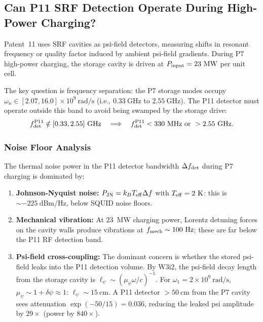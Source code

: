 \documentclass[aps,prd,twocolumn,superscriptaddress]{revtex4-2}
\begin{document}
\subsection{Can P11 SRF Detection Operate During High-Power Charging?}

Patent~11 uses SRF cavities as psi-field detectors, measuring shifts
in resonant frequency or quality factor induced by ambient psi-field
gradients.  During P7 high-power charging, the storage cavity is driven
at $P_{\rm input} = 23~\mathrm{MW}$ per unit cell.

The key question is frequency separation: the P7 storage modes occupy
$\omega_n \in [2.07, 16.0]\times 10^9~\mathrm{rad/s}$ (i.e.,
$0.33~\mathrm{GHz}$ to $2.55~\mathrm{GHz}$).  The P11 detector must
operate outside this band to avoid being swamped by the storage drive:
\begin{equation}
f_{\rm det}^{\rm P11} \notin [0.33, 2.55]~\mathrm{GHz}
\quad \Longrightarrow \quad f_{\rm det}^{\rm P11} < 330~\mathrm{MHz}
~\text{or}~ > 2.55~\mathrm{GHz}.
\end{equation}

\subsubsection{Noise Floor Analysis}

The thermal noise power in the P11 detector bandwidth $\Delta f_{\rm det}$
during P7 charging is dominated by:
\begin{enumerate}
\item \textbf{Johnson-Nyquist noise:} $P_{\rm JN} = k_B T_{\rm eff} \Delta f$
  with $T_{\rm eff} = 2~\mathrm{K}$: this is $\sim -225~\mathrm{dBm/Hz}$,
  below SQUID noise floors.
\item \textbf{Mechanical vibration:} At 23~MW charging power, Lorentz
  detuning forces on the cavity walls produce vibrations at
  $f_{\rm mech} \sim 100~\mathrm{Hz}$; these are far below the P11 RF
  detection band.
\item \textbf{Psi-field cross-coupling:} The dominant concern is whether
  the stored psi-field leaks into the P11 detection volume.  By W3i2,
  the psi-field decay length from the storage cavity is
  $\ell_\psi \sim (\mu_\psi \omega / c)^{-1}$.  For $\omega_1 = 2\times
  10^9~\mathrm{rad/s}$, $\mu_\psi \sim 1 + \delta\psi \approx 1$:
  $\ell_\psi \sim 15~\mathrm{cm}$.  A P11 detector $> 50~\mathrm{cm}$
  from the P7 cavity sees attenuation $\exp(-50/15) = 0.036$, reducing
  the leaked psi amplitude by $29\times$ (power by $840\times$).
\end{enumerate}
\end{document}
